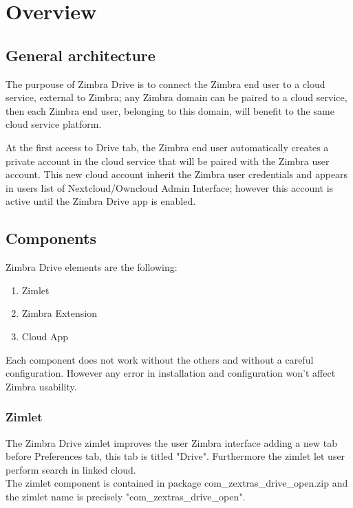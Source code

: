 \section{Overview}
\subsection{General architecture}\label{subsec:general architecture}
    The purpouse of Zimbra Drive is to connect the Zimbra end user to a cloud service, external to Zimbra;
    any Zimbra domain can be paired to a cloud service, then each Zimbra end user, belonging to this domain,
    will benefit to the same cloud service platform.

    At the first access to Drive tab, the Zimbra end user automatically creates a private account in the cloud service
    that will be paired with the Zimbra user account.
    This new cloud account inherit the Zimbra user credentials and appears in users list of Nextcloud/Owncloud Admin Interface;
    however this account is active until the Zimbra Drive app is enabled.

%

\subsection{Components}
    Zimbra Drive elements are the following:
    \begin{enumerate}
        \item Zimlet
        \item Zimbra Extension
        \item Cloud App
    \end{enumerate}
    \begin{warning}
        Each component does not work without the others and without a careful configuration.
        However any error in installation and configuration won't affect Zimbra usability.
    \end{warning}

        \subsubsection{Zimlet}
        The Zimbra Drive zimlet improves the user Zimbra interface adding a new tab before Preferences tab,
        this tab is titled "Drive". Furthermore the zimlet let user perform search in linked cloud.\\
        The zimlet component is contained in package com\_zextras\_drive\_open.zip and the zimlet name is precisely
        "com\_zextras\_drive\_open".

